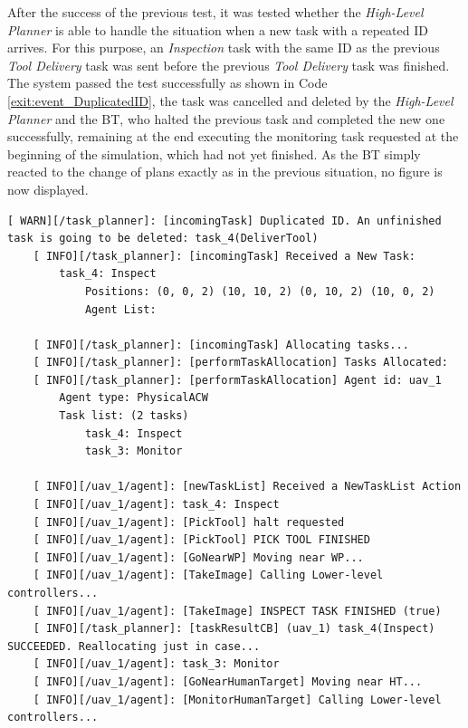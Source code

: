 After the success of the previous test, it was tested whether the \emph{High-Level Planner} is able to handle the situation when a new task with a repeated \gls{ID} arrives. For this purpose, an \emph{Inspection} task with the same \gls{ID} as the previous \emph{Tool Delivery} task was sent before the previous \emph{Tool Delivery} task was finished. The system passed the test successfully as shown in Code \ref{exit:event_DuplicatedID}, the task was cancelled and deleted by the \emph{High-Level Planner} and the \gls{BT}, who halted the previous task and completed the new one successfully, remaining at the end executing the monitoring task requested at the beginning of the simulation, which had not yet finished. As the \gls{BT} simply reacted to the change of plans exactly as in the previous situation, no figure is now displayed.

\begin{lstlisting}[caption={Feedback messages printed after the arrival of a task with a repeated id. \emph{Inspection} task overwrites \emph{Tool Delivery} task}, breaklines=true, label=exit:event_DuplicatedID]
    [ WARN][/task_planner]: [incomingTask] Duplicated ID. An unfinished task is going to be deleted: task_4(DeliverTool)
    [ INFO][/task_planner]: [incomingTask] Received a New Task:
        task_4: Inspect
            Positions: (0, 0, 2) (10, 10, 2) (0, 10, 2) (10, 0, 2)
            Agent List:
    
    [ INFO][/task_planner]: [incomingTask] Allocating tasks...
    [ INFO][/task_planner]: [performTaskAllocation] Tasks Allocated:
    [ INFO][/task_planner]: [performTaskAllocation] Agent id: uav_1
        Agent type: PhysicalACW
        Task list: (2 tasks)
            task_4: Inspect
            task_3: Monitor
    
    [ INFO][/uav_1/agent]: [newTaskList] Received a NewTaskList Action
    [ INFO][/uav_1/agent]: task_4: Inspect
    [ INFO][/uav_1/agent]: [PickTool] halt requested
    [ INFO][/uav_1/agent]: [PickTool] PICK TOOL FINISHED
    [ INFO][/uav_1/agent]: [GoNearWP] Moving near WP...
    [ INFO][/uav_1/agent]: [TakeImage] Calling Lower-level controllers...
    [ INFO][/uav_1/agent]: [TakeImage] INSPECT TASK FINISHED (true)
    [ INFO][/task_planner]: [taskResultCB] (uav_1) task_4(Inspect) SUCCEEDED. Reallocating just in case...
    [ INFO][/uav_1/agent]: task_3: Monitor
    [ INFO][/uav_1/agent]: [GoNearHumanTarget] Moving near HT...
    [ INFO][/uav_1/agent]: [MonitorHumanTarget] Calling Lower-level controllers...
\end{lstlisting}

